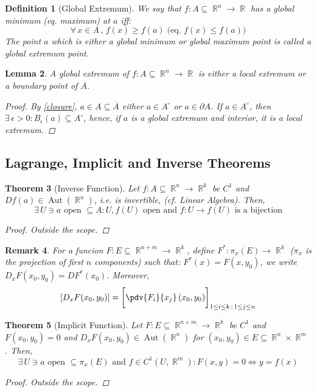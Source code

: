 \documentclass[12pt]{article}
\let\LR\Leftrightarrow
\let\ee\epsilon
\newcommand{\Forall}[1]{\forall\,{#1}\,,\,}
\newcommand{\Exist}[1]{\exists\,{#1}:}
\DeclareMathOperator{\R}{\mathbb{R}}
\DeclareMathOperator{\Aut}{Aut}
\newcommand{\cl}[1]{\overline{#1}}
\newtheorem{theorem}{Theorem}[subsection]
\newtheorem{definition}[theorem]{Definition}
\newtheorem{lemma}[theorem]{Lemma}
\newtheorem{remark}[theorem]{Remark}
\begin{document}
\begin{definition}[Global Extremum]
  We say that $f:A\subseteq\R^n\to\R$ has a global minimum (eq. maximum) at $a$ iff: $$\Forall{x\in A} f(x)\geq f(a)\;\Big(\text{eq. }f(x)\leq f(a)\Big)$$ The point $a$ which is either a global minimum or global maximum point is called a global extremum point.
\end{definition}

\begin{lemma}
  A global extremum of $f:A\subseteq\R^n\to\R$ is either a local extremum or a boundary point of $A$.
  \begin{proof}
    By \ref{closure}, $a\in A\subseteq\cl{A}$ either $a\in A^\circ$ or $a\in\partial A$. If $a\in A^\circ$, then $\Exist{\ee>0}B_\ee(a)\subseteq A^\circ$, hence, if $a$ is a global extremum and interior, it is a local extremum.
  \end{proof}
\end{lemma}

\pagebreak

\subsection{Lagrange, Implicit and Inverse Theorems}

\begin{theorem}[Inverse Function]
  Let $f:A\subseteq\R^n\to\R^k$ be $C^1$ and $Df(a)\in\Aut(\R^n)$, i.e. is invertible, (cf. Linear Algebra). Then, $$\Exist{U\ni a\text{ open }\subseteq A}U,f(U)\text{ open and }f:U\to f(U)\text{ is a bijection}$$
  \begin{proof}
    Outside the scope.
  \end{proof}
\end{theorem}

\begin{remark}
  For a funcion $F:E\subseteq\R^{n+m}\to\R^k$, define $F^*:\pi_x(E)\to\R^k$ ($\pi_x$ is the projection of first $n$ components) such  that: $F^*(x)=F(x,y_0)$, we write $D_x F(x_0,y_0)=DF^*(x_0)$. Moreover, $$[D_xF(x_0,y_0)]=\bigg[\pdv{F_i}{x_j}\,(x_0,y_0)\bigg]_{1\leq i\leq k\,;\,1\leq j\leq n}$$
\end{remark}

\begin{theorem}[Implicit Function]
  Let $F:E\subseteq\R^{n+m}\to\R^k$ be $C^1$ and $F(x_0,y_0)=0$ and $D_xF(x_0,y_0)\in\Aut(\R^n)$ for $(x_0,y_0)\in E\subseteq\R^n\times\R^m$. Then, $$\Exist{U\ni a\text{ open }\subseteq \pi_x(E)\text{ and }f\in C^1(U,\R^m)}F(x,y)=0\LR y=f(x)$$
  \begin{proof}
    Outside the scope.
  \end{proof}
\end{theorem}
\end{document}

